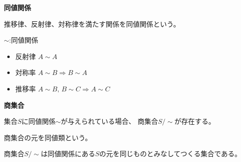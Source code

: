 \documentclass[12pt,b5paper]{ltjsarticle}
\begin{document}
\textbf{同値関係}

推移律、反射律、対称律を満たす関係を同値関係という。

$\sim$:同値関係
\begin{itemize}
 \item 反射律 $A\sim A$
 \item 対称率 $A\sim B \Rightarrow B\sim A$
 \item 推移率 $A\sim B , \, B\sim C \Rightarrow A\sim C$
\end{itemize}


\textbf{商集合}

集合$S$に同値関係$\sim$が与えられている場合、
商集合$S/\sim$が存在する。

商集合の元を同値類という。

商集合$S/\sim$は同値関係にある$S$の元を同じものとみなしてつくる集合である。



\hrulefill
\end{document}

